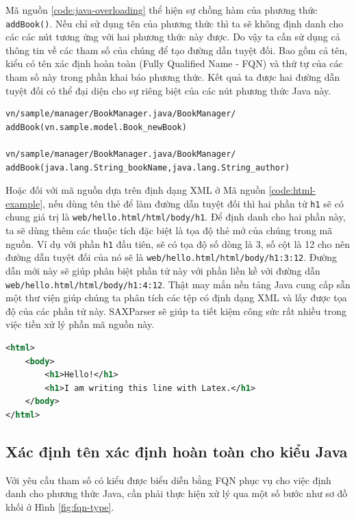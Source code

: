 \documentclass[12pt]{report}
\begin{document}
Mã nguồn \ref{code:java-overloading} thể hiện sự chồng hàm của phương thức \texttt{addBook()}. Nếu chỉ sử dụng tên của phương thức thì ta sẽ không định danh cho các các nút tương ứng với hai phương thức này được. Do vậy ta cần sử dụng cả thông tin về các tham số của chúng để tạo đường dẫn tuyệt đối. Bao gồm cả tên, kiểu có tên xác định hoàn toàn (Fully Qualified Name - FQN) và thứ tự của các tham số này trong phần khai báo phương thức. Kết quả ta được hai đường dẫn tuyệt đối có thể đại diện cho sự riêng biệt của các nút phương thức Java này.

\begin{verbatim}
vn/sample/manager/BookManager.java/BookManager/
addBook(vn.sample.model.Book_newBook)

vn/sample/manager/BookManager.java/BookManager/
addBook(java.lang.String_bookName,java.lang.String_author)
\end{verbatim}

Hoặc đối với mã nguồn dựa trên định dạng XML ở Mã nguồn \ref{code:html-example}, nếu dùng tên thẻ để làm đường dẫn tuyệt đối thì hai phần tử \texttt{h1} sẽ có chung giá trị là \texttt{web/hello.html/html/body/h1}. Để định danh cho hai phần này, ta sẽ dùng thêm các thuộc tích đặc biệt là tọa độ thẻ mở của chúng trong mã nguồn. Ví dụ với phần \texttt{h1} đầu tiên, sẽ có tọa độ số dòng là 3, số cột là 12 cho nên đường dẫn tuyệt đối của nó sẽ là \texttt{web/hello.html/html/body/h1:3:12}. Đường dẫn mới này sẽ giúp phân biệt phần tử này với phần liền kề với đường dẫn \texttt{web/hello.html/html/body/h1:4:12}. Thật may mắn nền tảng Java cung cấp sẵn một thư viện giúp chúng ta phân tích các tệp có định dạng XML và lấy được tọa độ của các phần tử này. SAXParser sẽ giúp ta tiết kiệm công sức rất nhiều trong việc tiền xử lý phần mã nguồn này.

\begin{lstlisting}[language=XML,
caption={Ví dụ mã nguồn HTML},label={code:html-example}]
<html>
	<body>
		<h1>Hello!</h1>
		<h1>I am writing this line with Latex.</h1>
	</body>
</html>
\end{lstlisting}

\subsection{Xác định tên xác định hoàn toàn cho kiểu Java}
Với yêu cầu tham số có kiểu được biểu diễn bằng FQN phục vụ cho việc định danh cho phương thức Java, cần phải thực hiện xử lý qua một số bước như sơ đồ khối ở Hình \ref{fig:fqn-type}.
\end{document}
